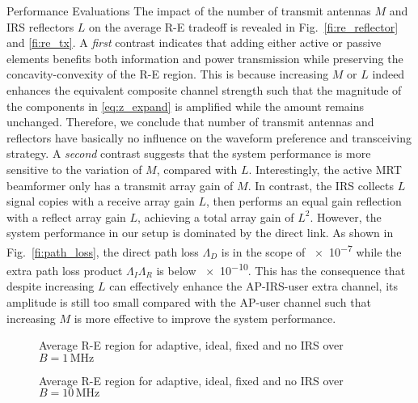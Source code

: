\documentclass[journal]{IEEEtran}
\begin{document}
\begin{section}{Performance Evaluations}
		The impact of the number of transmit antennas $M$ and IRS reflectors $L$ on the average R-E tradeoff is revealed in Fig.~\ref{fi:re_reflector} and \ref{fi:re_tx}. A \textit{first} contrast indicates that adding either active or passive elements benefits both information and power transmission while preserving the concavity-convexity of the R-E region. This is because increasing $M$ or $L$ indeed enhances the equivalent composite channel strength such that the magnitude of the components in \ref{eq:z_expand} is amplified while the amount remains unchanged. Therefore, we conclude that number of transmit antennas and reflectors have basically no influence on the waveform preference and transceiving strategy. A \textit{second} contrast suggests that the system performance is more sensitive to the variation of $M$, compared with $L$. Interestingly, the active MRT beamformer only has a transmit array gain of $M$. In contrast, the IRS collects $L$ signal copies with a receive array gain $L$, then performs an equal gain reflection with a reflect array gain $L$, achieving a total array gain of $L^2$. However, the system performance in our setup is dominated by the direct link. As shown in Fig.~\ref{fi:path_loss}, the direct path loss $\Lambda_D$ is in the scope of \num{e-7} while the extra path loss product $\Lambda_I\Lambda_R$ is below \num{e-10}. This has the consequence that despite increasing $L$ can effectively enhance the AP-IRS-user extra channel, its amplitude is still too small compared with the AP-user channel such that increasing $M$ is more effective to improve the system performance.

		\begin{figure}[!t]
			\centering
			\begin{adjustbox}{width=\linewidth}
				
			\end{adjustbox}
			\caption{Average R-E region for adaptive, ideal, fixed and no IRS over $B=1\,\si{\MHz}$}
			\label{fi:re_irs_1mhz}
		\end{figure}

		\begin{figure}[!t]
			\centering
			\begin{adjustbox}{width=\linewidth}
				
			\end{adjustbox}
			\caption{Average R-E region for adaptive, ideal, fixed and no IRS over $B=10\,\si{\MHz}$}
			\label{fi:re_irs_10mhz}
		\end{figure}


\end{section}
\end{document}
